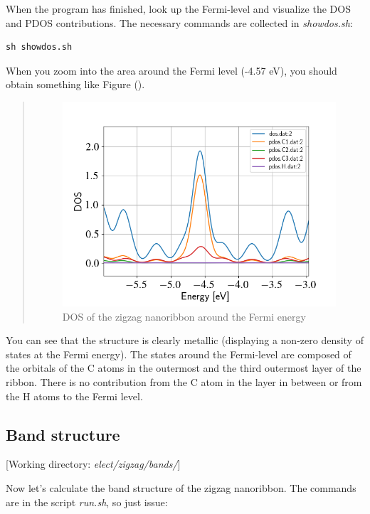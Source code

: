 \documentclass[a4paper,11pt,english]{sphinxmanual}
\begin{document}
{{When the program has finished, look up the Fermi-level and visualize
the DOS and PDOS contributions. The necessary commands are collected
in \emph{showdos.sh}:

\begin{Verbatim}[commandchars=\\\{\}]
sh showdos.sh
\end{Verbatim}

When you zoom into the area around the Fermi level (-4.57 eV), you
should obtain something like Figure {\hyperref[electstruct:fig-zigzag-dos]{\emph{}}} ().
\begin{quote}
\vskip -0.2cm  
\begin{figure}[htbp]
\centering
\capstart
\includegraphics[width=0.650\linewidth]{zigzag-dos.png}
\caption{DOS of the zigzag nanoribbon around the Fermi energy}\label{electstruct:fig-zigzag-dos}\end{figure}
\end{quote}

You can see that the structure is clearly metallic (displaying a
non-zero density of states at the Fermi energy). The states around the
Fermi-level are composed of the orbitals of the C atoms in the
outermost and the third outermost layer of the ribbon. There is no
contribution from the C atom in the layer in between or from the H
atoms to the Fermi level.


\subsection{Band structure}
\label{electstruct:id1}
{[}Working directory: \emph{elect/zigzag/bands/}{]}

Now let's calculate the band structure of the zigzag nanoribbon. The
commands are in the script \emph{run.sh}, so just issue:

}}
\end{document}
